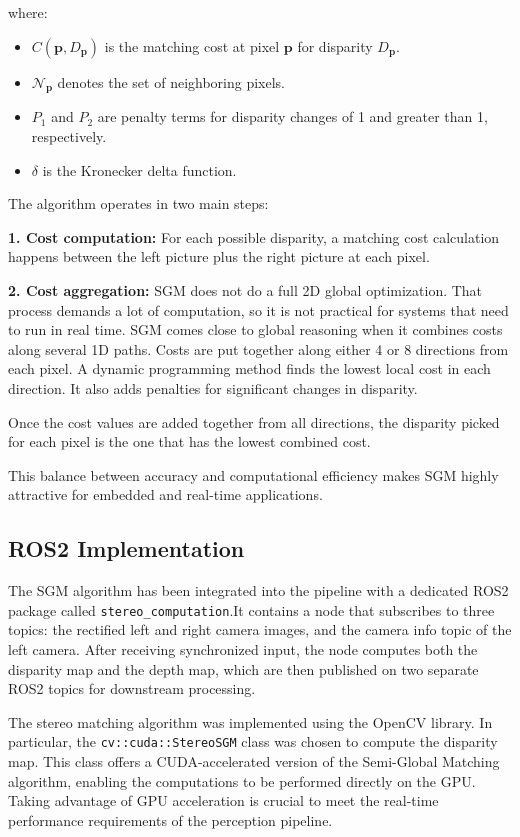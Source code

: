where:
\begin{itemize}
  \item $C(\mathbf{p}, D_{\mathbf{p}})$ is the matching cost at pixel $\mathbf{p}$ for disparity $D_{\mathbf{p}}$.
  \item $\mathcal{N}_{\mathbf{p}}$ denotes the set of neighboring pixels.
  \item $P_1$ and $P_2$ are penalty terms for disparity changes of 1 and greater than 1, respectively.
  \item $\delta$ is the Kronecker delta function.
\end{itemize}

The algorithm operates in two main steps:

\textbf{1. Cost computation:}  
For each possible disparity, a matching cost calculation happens between the left picture plus 
the right picture at each pixel.

\textbf{2. Cost aggregation:}  
SGM does not do a full 2D global optimization. That process demands a lot of computation, so it 
is not practical for systems that need to run in real time. SGM comes close to global reasoning when 
it combines costs along several 1D paths. Costs are put together along either 4 or 8 directions from
each pixel. A dynamic programming method finds the lowest local cost in each direction. 
It also adds penalties for significant changes in disparity.

Once the cost values are added together from all directions, the disparity picked for each pixel is the one that has the lowest combined cost.


This balance between accuracy and computational efficiency makes SGM highly attractive for embedded 
and real-time applications. 

\subsection{ROS2 Implementation}\label{sec:ROS2Implementation}

The SGM algorithm has been integrated into the pipeline with a dedicated ROS2 package called 
\texttt{stereo\_computation}.It contains a node that subscribes to three topics: the rectified left and right 
camera images, and the camera info topic of the left camera. 
After receiving synchronized input, the node computes both the disparity map and the depth map, 
which are then published on two separate ROS2 topics for downstream processing.

The stereo matching algorithm was implemented using the OpenCV library. In particular, the 
\texttt{cv::cuda::StereoSGM} class was chosen to compute the disparity map. This class offers a 
CUDA-accelerated version of the Semi-Global Matching algorithm, enabling the computations to be 
performed directly on the GPU. Taking advantage of GPU acceleration is crucial to meet the real-time 
performance requirements of the perception pipeline.

